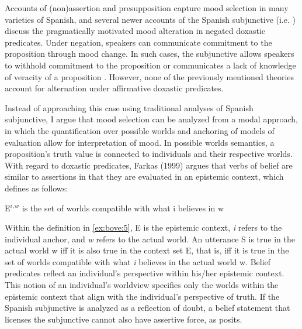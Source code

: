 \documentclass[output=paper,colorlinks,citecolor=brown,
]{langscibook}
\begin{document}
Accounts of (non)assertion and presupposition capture mood selection in many varieties of Spanish, and several newer accounts of the Spanish subjunctive (i.e. \citealt{Mejias-Bikandi1998,Haverkate2002}) discuss the pragmatically motivated mood alteration in negated doxastic predicates. Under negation, speakers can communicate commitment to the proposition through mood change. In such cases, the subjunctive allows speakers to withhold commitment to the proposition \citep{Mejias-Bikandi1998} or communicates a lack of knowledge of veracity of a proposition \citep{Haverkate2002}. However, none of the previously mentioned theories account for alternation under affirmative doxastic predicates. 



Instead of approaching this case using traditional analyses of Spanish subjunctive, I argue that mood selection can be analyzed from a modal approach, in which the quantification over possible worlds and anchoring of models of evaluation allow for interpretation of mood. In possible worlds semantics, a proposition's truth value is connected to individuals and their respective worlds. With regard to doxastic predicates, Farkas (1999) argues that verbs of belief are similar to assertions in that they are evaluated in an epistemic context, which \citet[7]{Farkas2003} defines as follows:

\begin{exe}
    \ex\label{ex:bove:5}
    E$^{i,w}$ is the set of worlds compatible with what i believes in w
\end{exe}


Within the definition in \ref{ex:bove:5}, E is the epistemic context, \textit{i }refers to the individual anchor, and \textit{w} refers to the actual world. An utterance S is true in the actual world w iff it is also true in the context set E, that is, iff it is true in the set of worlds compatible with what \textit{i }believes in the actual world w. Belief predicates reflect an individual's perspective within his/her epistemic context. This notion of an individual's worldview specifies only the worlds within the epistemic context that align with the individual's perspective of truth. If the Spanish subjunctive is analyzed as a reflection of doubt, a belief statement that licenses the subjunctive cannot also have assertive force, as \citet{Farkas2003} posits.
\end{document}
